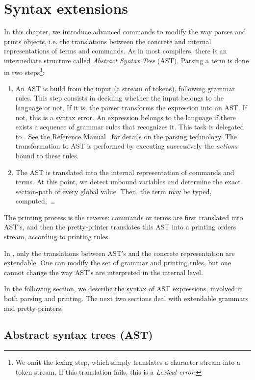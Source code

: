 \chapter{Syntax extensions}
\label{Addoc-syntax}

In this chapter, we introduce advanced commands to modify the way
{\Coq} parses and prints objects, i.e. the translations between the
concrete and internal representations of terms and commands. As in
most compilers, there is an intermediate structure called {\em Abstract
Syntax Tree} (AST). Parsing a term is done in two steps\footnote{
  We omit the lexing step, which simply translates a character stream
  into a token stream. If this translation fails, this is a
  \emph{Lexical error}.
}:
\begin{enumerate}
\item An AST is build from the input (a stream of tokens), following
  grammar rules. This step consists in deciding whether the input
  belongs to the language or not. If it is, the parser transforms the
  expression into an AST. If not, this is a syntax error. An expression
  belongs to the language if there exists a sequence of grammar rules
  that recognizes it. This task is delegated to {\camlpppp}. See the
  Reference Manual~\cite{ddr98} for details on the parsing
  technology. The transformation to AST is performed by executing
  successively the {\sl actions} bound to these rules.
  
\item The AST is translated into the internal representation of
  commands and terms. At this point, we detect unbound variables and
  determine the exact section-path of every global value. Then, the term
  may be typed, computed,~\ldots
\end{enumerate}
The printing process is the reverse: commands or terms are first
translated into AST's, and then the pretty-printer translates this AST
into a printing orders stream, according to printing rules.

In {\Coq}, only the translations between AST's and the concrete
representation are extendable. One can modify the set of grammar and
printing rules, but one cannot change the way AST's are interpreted in
the internal level.

In the following section, we describe the syntax of AST expressions,
involved in both parsing and printing. The next two sections deal with
extendable grammars and pretty-printers.

\section{Abstract syntax trees (AST)}

